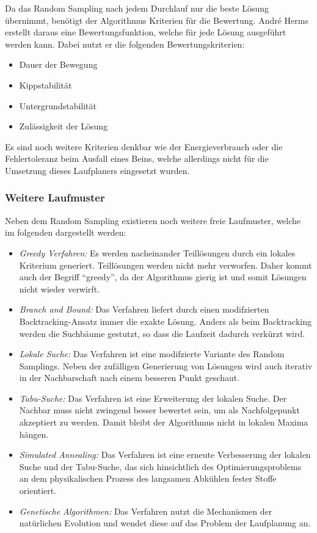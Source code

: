 Da das Random Sampling nach jedem Durchlauf nur die beste Lösung übernimmt, benötigt der Algorithmus Kriterien für die Bewertung. André Herms erstellt daraus eine Bewertungsfunktion, welche für jede Lösung ausgeführt werden kann. Dabei nutzt er die folgenden Bewertungskriterien:
\begin{itemize}
  \item Dauer der Bewegung
  \item Kippstabilität
  \item Untergrundstabilität
  \item Zulässigkeit der Lösung
\end{itemize}

Es sind noch weitere Kriterien denkbar wie der Energieverbrauch oder die Fehlertoleranz beim Ausfall eines Beins, welche allerdings nicht für die Umsetzung dieses Laufplaners eingesetzt wurden.

\subsubsection{Weitere Laufmuster}

Neben dem Random Sampling existieren noch weitere freie Laufmuster, welche im folgenden dargestellt werden:
\begin{itemize}
  \item \emph{Greedy Verfahren:} Es werden nacheinander Teillösungen durch ein lokales Kriterium generiert. Teillösungen werden nicht mehr verworfen. Daher kommt auch der Begriff "`greedy"', da der Algorithmus gierig ist und somit Lösungen nicht wieder verwirft.
  \item \emph{Branch and Bound:} Das Verfahren liefert durch einen modifzierten Backtracking-Ansatz immer die exakte Lösung. Anders als beim Backtracking werden die Suchbäume gestutzt, so dass die Laufzeit dadurch verkürzt wird.
  \item \emph{Lokale Suche:} Das Verfahren ist eine modifzierte Variante des Random Samplings. Neben der zufälligen Generierung von Lösungen wird auch iterativ in der Nachbarschaft nach einem besseren Punkt geschaut.
  \item \emph{Tabu-Suche:} Das Verfahren ist eine Erweiterung der lokalen Suche. Der Nachbar muss nicht zwingend besser bewertet sein, um als Nachfolgepunkt akzeptiert zu werden. Damit bleibt der Algorithmus nicht in lokalen Maxima hängen.
  \item \emph{Simulated Annealing:} Das Verfahren ist eine erneute Verbesserung der lokalen Suche und der Tabu-Suche, das sich hinsichtlich des Optimierungsproblems an dem physikalischen Prozess des langsamen Abkühlen fester Stoffe orientiert.
  \item \emph{Genetische Algorithmen:} Das Verfahren nutzt die Mechanismen der natürlichen Evolution und wendet diese auf das Problem der Laufplanung an.
\end{itemize}

